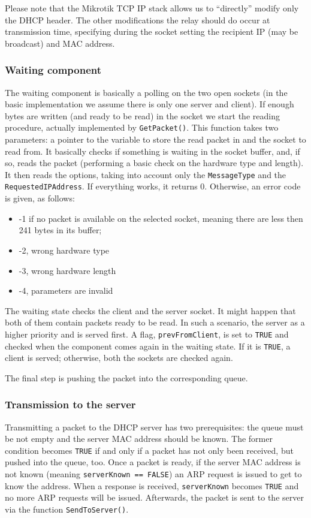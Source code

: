 Please note that the Mikrotik TCP IP stack allows us to ``directly'' modify only the DHCP header. The other modifications the relay should do occur at transmission time, specifying during the socket setting the recipient IP (may be broadcast) and MAC address.

\subsubsection{Waiting component}
The waiting component is basically a polling on the two open sockets (in the basic implementation we assume there is only one server and client). If enough bytes are written (and ready to be read) in the socket we start the reading procedure, actually implemented by \texttt{GetPacket()}. This function takes two parameters: a pointer to the variable to store the read packet in and the socket to read from. It basically checks if something is waiting in the socket buffer, and, if so, reads the packet (performing a basic check on the hardware type and length). It then reads the options, taking into account only the \texttt{MessageType} and the \texttt{RequestedIPAddress}. If everything works, it returns 0. Otherwise, an error code is given, as follows:
\begin{itemize}
	\item -1 if no packet is available on the selected socket, meaning
there are less then 241 bytes in its buffer;
	\item -2, wrong hardware type          
 	\item -3, wrong hardware length
	\item -4, parameters are invalid
\end{itemize}
The waiting state checks the client and the server socket. It might happen that both of them contain packets ready to be read. In such a scenario, the server as a higher priority and is served first. A flag, \texttt{prevFromClient}, is set to \texttt{TRUE} and checked when the component comes again in the waiting state. If it is \texttt{TRUE}, a client is served; otherwise, both the sockets are checked again.

The final step is pushing the packet into the corresponding queue.

\subsubsection{Transmission to the server}
Transmitting a packet to the DHCP server has two prerequisites: the queue must be not empty and the server MAC address should be known. The former condition becomes \texttt{TRUE} if and only if a packet has not only been received, but pushed into the queue, too. Once a packet is ready, if the server MAC address is not known (meaning \texttt{serverKnown == FALSE}) an ARP request is issued to get to know the address. When a response is received, \texttt{serverKnown} becomes \texttt{TRUE} and no more ARP requests will be issued. Afterwards, the packet is sent to the server via the function \texttt{SendToServer()}. 

